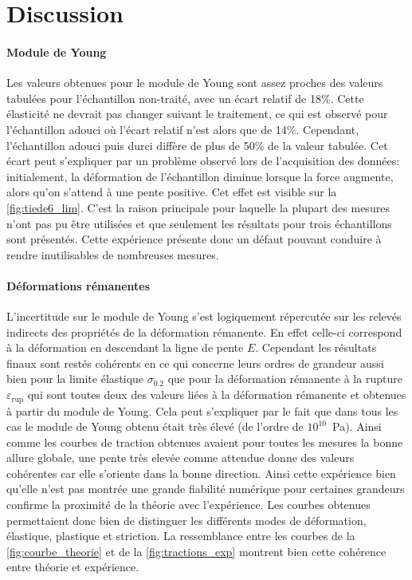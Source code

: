 \section{Discussion}
\paragraph{Module de Young}
Les valeurs obtenues pour le module de Young sont assez proches des valeurs tabulées pour l'échantillon non-traité, avec un écart relatif de 18\%. Cette élasticité ne devrait pas changer suivant le traitement, ce qui est observé pour l'échantillon adouci où l'écart relatif n'est alors que de 14\%. Cependant, l'échantillon adouci puis durci diffère de plus de 50\% de la valeur tabulée. Cet écart peut s'expliquer par un problème observé lors de l'acquisition des données: initialement, la déformation de l'échantillon diminue lorsque la force augmente, alors qu'on s'attend à une pente positive. Cet effet est visible sur la \autoref{fig:tiede6_lim}. C'est la raison principale pour laquelle la plupart des mesures n'ont pas pu être utilisées et que seulement les résultats pour trois échantillons sont présentés. Cette expérience présente donc un défaut pouvant conduire à rendre inutilisables de nombreuses mesures.

\paragraph{Déformations rémanentes}
L'incertitude sur le module de Young s'est logiquement répercutée sur les relevés indirects des propriétés de la déformation rémanente. En effet celle-ci correspond à la déformation en descendant la ligne de pente $E$. Cependant les résultats finaux sont restés cohérents en ce qui concerne leurs ordres de grandeur aussi bien pour la limite élastique $\sigma_{0.2}$ que pour la déformation rémanente à la rupture $\varepsilon_\mathrm{rup}$ qui sont toutes deux des valeurs liées à la déformation rémanente et obtenues à partir du module de Young. Cela peut s'expliquer par le fait que dans tous les cas le module de Young obtenu était très élevé (de l'ordre de \mbox{$10^{10}$ \si{\pascal}}). Ainsi comme les courbes de traction obtenues avaient pour toutes les mesures la bonne allure globale, une pente très elevée comme attendue donne des valeurs cohérentes car elle s'oriente dans la bonne direction. Ainsi cette expérience bien qu'elle n'est pas montrée une grande fiabilité numérique pour certaines grandeurs confirme la proximité de la théorie avec l'expérience. Les courbes obtenues permettaient donc bien de distinguer les différents modes de déformation, élastique, plastique et striction. La ressemblance entre les courbes de la \autoref{fig:courbe_theorie} et de la \autoref{fig:tractions_exp} montrent bien cette cohérence entre théorie et expérience.


